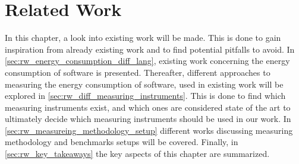 \chapter{Related Work}\label{ch:related_work}

In this chapter, a look into existing work will be made. This is done to gain inspiration from already existing work and to find potential pitfalls to avoid. In \cref{sec:rw_energy_consumption_diff_lang}, existing work concerning the energy consumption of software is presented. Thereafter, different approaches to measuring the energy consumption of software, used in existing work will be explored in \cref{sec:rw_diff_measuring_instruments}. This is done to find which measuring instruments exist, and which ones are considered state of the art to ultimately decide which measuring instruments should be used in our work. In \cref{sec:rw_measureing_methodology_setup} different works discussing measuring methodology and benchmarks setups will be covered. Finally, in \cref{sec:rw_key_takeaways} the key aspects of this chapter are summarized.


% 


